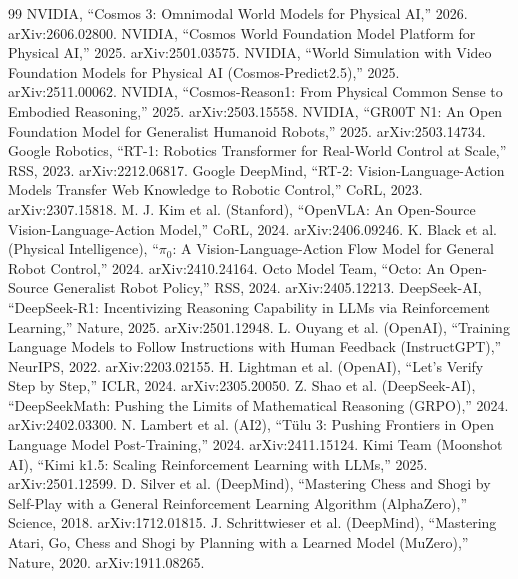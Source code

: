 \documentclass[10pt,conference]{IEEEtran}
\begin{document}
\begin{thebibliography}{99}
 NVIDIA, ``Cosmos 3: Omnimodal World Models for Physical AI,''
  2026. arXiv:2606.02800.
 NVIDIA, ``Cosmos World Foundation Model Platform for Physical
  AI,'' 2025. arXiv:2501.03575.
 NVIDIA, ``World Simulation with Video Foundation Models for
  Physical AI (Cosmos-Predict2.5),'' 2025. arXiv:2511.00062.
 NVIDIA, ``Cosmos-Reason1: From Physical Common Sense to Embodied
  Reasoning,'' 2025. arXiv:2503.15558.
 NVIDIA, ``GR00T N1: An Open Foundation Model for Generalist
  Humanoid Robots,'' 2025. arXiv:2503.14734.
 Google Robotics, ``RT-1: Robotics Transformer for Real-World
  Control at Scale,'' RSS, 2023. arXiv:2212.06817.
 Google DeepMind, ``RT-2: Vision-Language-Action Models Transfer
  Web Knowledge to Robotic Control,'' CoRL, 2023. arXiv:2307.15818.
 M. J. Kim et al. (Stanford), ``OpenVLA: An Open-Source
  Vision-Language-Action Model,'' CoRL, 2024. arXiv:2406.09246.
 K. Black et al. (Physical Intelligence), ``$\pi_0$: A
  Vision-Language-Action Flow Model for General Robot Control,'' 2024.
  arXiv:2410.24164.
 Octo Model Team, ``Octo: An Open-Source Generalist Robot
  Policy,'' RSS, 2024. arXiv:2405.12213.
 DeepSeek-AI, ``DeepSeek-R1: Incentivizing Reasoning Capability in
  LLMs via Reinforcement Learning,'' Nature, 2025. arXiv:2501.12948.
 L. Ouyang et al. (OpenAI), ``Training Language Models to Follow
  Instructions with Human Feedback (InstructGPT),'' NeurIPS, 2022. arXiv:2203.02155.
 H. Lightman et al. (OpenAI), ``Let's Verify Step by Step,'' ICLR,
  2024. arXiv:2305.20050.
 Z. Shao et al. (DeepSeek-AI), ``DeepSeekMath: Pushing the Limits
  of Mathematical Reasoning (GRPO),'' 2024. arXiv:2402.03300.
 N. Lambert et al. (AI2), ``T\"ulu 3: Pushing Frontiers in Open
  Language Model Post-Training,'' 2024. arXiv:2411.15124.
 Kimi Team (Moonshot AI), ``Kimi k1.5: Scaling Reinforcement
  Learning with LLMs,'' 2025. arXiv:2501.12599.
 D. Silver et al. (DeepMind), ``Mastering Chess and Shogi by
  Self-Play with a General Reinforcement Learning Algorithm (AlphaZero),''
  Science, 2018. arXiv:1712.01815.
 J. Schrittwieser et al. (DeepMind), ``Mastering Atari, Go, Chess
  and Shogi by Planning with a Learned Model (MuZero),'' Nature, 2020.
  arXiv:1911.08265.
\end{thebibliography}
\end{document}

